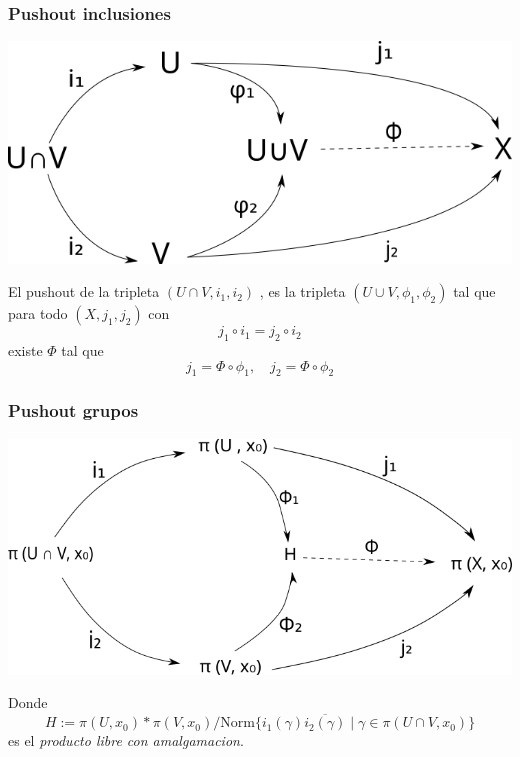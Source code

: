 \documentclass[xetex,mathserif,serif]{beamer}
\begin{document}
  \begin{frame}
    \frametitle{Pushout inclusiones}
    \begin{center}
       \includegraphics[scale=0.5]{./imag/push-inc-3.png}
    \end{center}
    El pushout de la tripleta \(\left( U \cap V, i_1, i_2 \right)\) , es
    la tripleta \(\left( U \cup V, \phi_1, \phi_2 \right)\) tal que para
    todo \((X, j_1, j_2)\) con
    \[ j_1 \circ i_1 = j_2 \circ i_2 \]
    existe \(\Phi\) tal que
    \[ j_1 = \Phi \circ \phi_1,\quad j_2 = \Phi \circ \phi_2 \]
  \end{frame}

  \begin{frame}
    \frametitle{Pushout grupos}
    \begin{center}
       \includegraphics[scale=0.5]{../tesis/imagenes/van.png}
    \end{center}
    Donde
    \[ H := \pi (U, x_0) * \pi (V, x_0) / \text{Norm} \{i_1 (\gamma)
      \overline{i_2 (\gamma)} \mid \gamma \in \pi (U \cap V, x_0)\}\]
    es el \emph{producto libre con amalgamacion}.
  \end{frame}
\end{document}
